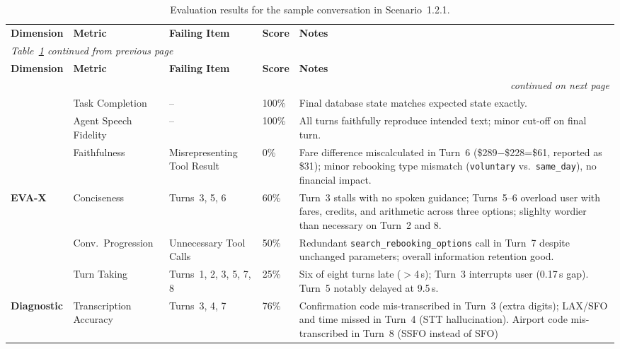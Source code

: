 {\small\begin{longtable}{
  p{}
  p{}
  p{}
  p{}
  p{}}
\captionsetup{font=small}
\caption{Evaluation results for the sample conversation in Scenario~1.2.1.}
\label{tab:scenario121-results} \\
\toprule
\textbf{Dimension} & \textbf{Metric} & \textbf{Failing Item} & \textbf{Score} & \textbf{Notes} \\
\midrule
\endfirsthead
\multicolumn{5}{l}{\emph{Table~\ref{tab:scenario121-results} continued from previous page}} \\
\toprule
\textbf{Dimension} & \textbf{Metric} & \textbf{Failing Item} & \textbf{Score} & \textbf{Notes} \\
\midrule
\endhead
\midrule \multicolumn{5}{r}{\emph{continued on next page}} \\
\endfoot
\bottomrule
\endlastfoot

\multirow{4}{*}{\textbf{EVA-A}}
  & Task Completion       & --                              & 100\%  & Final database state matches expected state exactly. \\
  & Agent Speech Fidelity & --                              & 100\%  & All turns faithfully reproduce intended text; minor cut-off on final turn. \\
  & Faithfulness          & Misrepresenting Tool Result     & 0\%    & Fare difference miscalculated in Turn~6 (\$289$-$\$228=\$61, reported as \$31); minor rebooking type mismatch (\texttt{voluntary} vs.\ \texttt{same\_day}), no financial impact. \\
\midrule

\multirow{3}{*}{\textbf{EVA-X}}
  & Conciseness           & Turns~3, 5, 6                  & 60\%   & Turn~3 stalls with no spoken guidance; Turns~5--6 overload user with fares, credits, and arithmetic across three options; slighlty wordier than necessary on Turn~2 and 8. \\
  & Conv.\ Progression    & Unnecessary Tool Calls          & 50\%   & Redundant \texttt{search\_rebooking\_options} call in Turn~7 despite unchanged parameters; overall information retention good. \\
  & Turn Taking           & Turns~1, 2, 3, 5, 7, 8            & 25\%   & Six of eight turns late ($>$4\,s); Turn~3 interrupts user (0.17\,s gap). Turn~5 notably delayed at 9.5\,s. \\
\midrule

\textbf{Diagnostic}
  & Transcription Accuracy & Turns~3, 4, 7                    & 76\%   & Confirmation code mis-transcribed in Turn~3 (extra digits); LAX/SFO and time missed in Turn~4 (STT hallucination). Airport code mis-transcribed in Turn~8 (SSFO instead of SFO)\\

\end{longtable}}